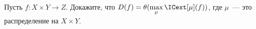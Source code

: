 Пусть $f: X \times Y \to Z$. Докажите, что $D(f) = \theta(\max\limits_{\mu} \ICext[\mu](f))$, где
$\mu$~--- это распределение на $X \times Y$.